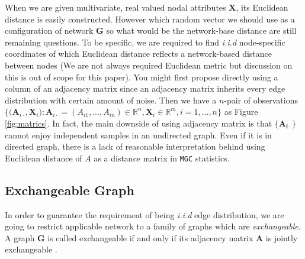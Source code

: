 \documentclass[12pt]{article}
\theoremstyle{definition}
\begin{document}
When we are given multivariate, real valued nodal attributes $\mathbf{X}$, its Euclidean distance is easily constructed. However which random vector we should use as a configuration of network $\mathbf{G}$ so what would be the network-base distance are still remaining questions. To be specific, we are required to find \textit{i.i.d} node-specific coordinates of which Euclidean distance reflects a network-based distance between nodes (We are not always required Euclidean metric \citep{lyons2013distance} but discussion on this is out of scope for this paper). You might first propose directly using a column of an adjacency matrix since an adjacency matrix inherits every edge distribution with certain amount of noise. Then we have a $n$-pair of observations $\big\{ \big( \mathbf{A}_{i \cdot} , \mathbf{X}_{i} \big) : \mathbf{A}_{i \cdot} = (A_{i 1} , ... , A_{i n} ) \in \mathbb{R}^{n}, \mathbf{X}_{i} \in \mathbb{R}^{m}, i=1,...,n  \big\}$ as Figure \ref{fig:matrics}. In fact, the main downside of using adjacency matrix is that $\{ \mathbf{A_{i \cdot}}  \}$ cannot enjoy independent samples in an undirected graph. Even if it is in directed graph, there is a lack of reasonable interpretation behind using Euclidean distance of $A$ as a distance matrix in \texttt{MGC} statistics. 
	
\subsection{Exchangeable Graph}

In order to guarantee the requirement of being \textit{i.i.d} edge distribution, we are going to restrict applicable network to a family of graphs which are \textit{exchangeable}. A graph $\mathbf{G}$ is called exchangeable if and only if its adjacency matrix $\mathbf{A}$ is jointly exchangeable \citep{orbanz2015bayesian}. 
	
\end{document}
